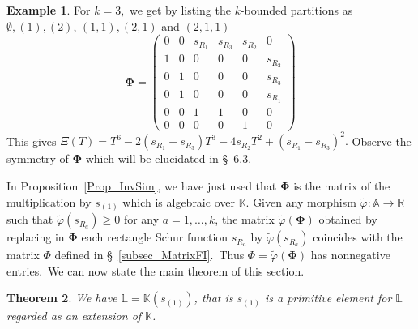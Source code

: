 \documentclass[10pt,a4paper]{amsart}
\newtheorem{theorem}{Theorem}[section]
\theoremstyle{definition}
\newtheorem{exam}[theorem]{Example}
\begin{document}

\begin{exam}
\label{ex_k3_Phi}For $k=3,$ we get by listing the $k$-bounded partitions as
$\emptyset,(1),(2)$, $(1,1),(2,1)$ and $(2,1,1)$%
\[
\boldsymbol{\Phi}=\left(
\begin{matrix}
0 & 0 & s_{R_{1}} & s_{R_{3}} & s_{R_{2}} & 0\\
1 & 0 & 0 & 0 & 0 & s_{R_{2}}\\
0 & 1 & 0 & 0 & 0 & s_{R_{3}}\\
0 & 1 & 0 & 0 & 0 & s_{R_{1}}\\
0 & 0 & 1 & 1 & 0 & 0\\
0 & 0 & 0 & 0 & 1 & 0
\end{matrix}
\right)
\]
This gives $\Xi(T)=T^{6}-2\left( s_{R_{1}}+s_{R_{3}}\right) T^{3}-4s_{R_{2}%
}T^{2}+\left( s_{R_{1}}-s_{R_{3}}\right) ^{2}.$ Observe the symmetry of
$\boldsymbol{\Phi}$ which will be elucidated in \S~\href{https://alco.centre-mersenne.org/articles/10.5802/alco.147/}{6.3}.
\end{exam}

In Proposition~\ref{Prop_InvSim}, we have just used that $\boldsymbol{\Phi}$
is the matrix of the multiplication by $s_{(1)}$ which is algebraic over
$\mathbb{K}$. Given any morphism $\widetilde{\varphi}:\mathbb{A}%
\rightarrow\mathbb{R}$ such that $\widetilde{\varphi}(s_{R_{a}})\geq0$ for any
$a=1,\ldots,k$, the matrix $\widetilde{\varphi}(\boldsymbol{\Phi})$ obtained
by replacing in $\boldsymbol{\Phi}$ each rectangle Schur function $s_{R_{a}}$
by $\widetilde{\varphi}(s_{R_{a}})$ coincides with the matrix $\Phi$ defined
in \S~\ref{subsec_MatrixFI}.\ Thus $\Phi=\widetilde{\varphi}%
(\boldsymbol{\Phi})$ has nonnegative entries.\ We can now state the
main theorem of this section.

\begin{theorem}
We have $\mathbb{L}=\mathbb{K}(s_{(1)})$, that is $s_{(1)}$ is a primitive
element for $\mathbb{L}$ regarded as an extension of $\mathbb{K}$.
\end{theorem}
\end{document}
